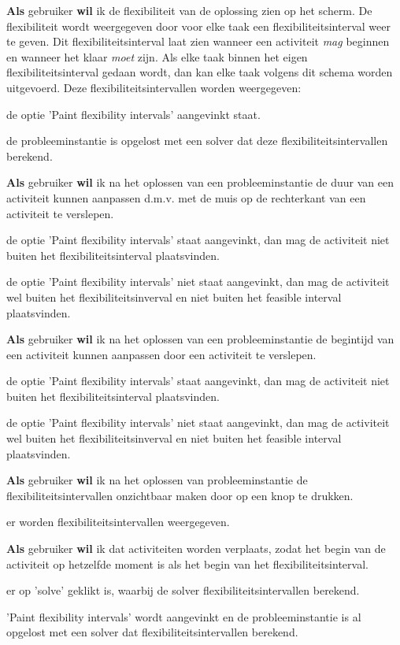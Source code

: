 \nextUserStory
\textbf{Als} gebruiker \textbf{wil} ik de flexibiliteit van de oplossing zien op het scherm. De flexibiliteit wordt weergegeven door voor elke taak een flexibiliteitsinterval weer te geven. Dit flexibiliteitsinterval laat zien wanneer een activiteit \emph{mag} beginnen en wanneer het klaar \emph{moet} zijn. Als elke taak binnen het eigen flexibiliteitsinterval gedaan wordt, dan kan elke taak volgens dit schema worden uitgevoerd. Deze flexibiliteitsintervallen worden weergegeven:
\beginGegeven
    \item de optie 'Paint flexibility intervals' aangevinkt staat.
    \item de probleeminstantie is opgelost met een solver dat deze flexibiliteitsintervallen berekend. 
\endGegeven

\nextUserStory
\textbf{Als} gebruiker \textbf{wil} ik na het oplossen van een probleeminstantie de duur van een activiteit kunnen aanpassen d.m.v. met de muis op de rechterkant van een activiteit te verslepen. 
\beginAls
    \item de optie 'Paint flexibility intervals' staat aangevinkt, dan mag de activiteit niet buiten het flexibiliteitsinterval plaatsvinden. 
    \item de optie 'Paint flexibility intervals' niet staat aangevinkt, dan mag de activiteit wel buiten het flexibiliteitsinverval en niet buiten het feasible interval plaatsvinden. 
\endAls

\nextUserStory 
\textbf{Als} gebruiker \textbf{wil} ik na het oplossen van een probleeminstantie de begintijd van een activiteit kunnen aanpassen door een activiteit te verslepen.
\beginAls
    \item de optie 'Paint flexibility intervals' staat aangevinkt, dan mag de activiteit niet buiten het flexibiliteitsinterval plaatsvinden. 
    \item de optie 'Paint flexibility intervals' niet staat aangevinkt, dan mag de activiteit wel buiten het flexibiliteitsinverval en niet buiten het feasible interval plaatsvinden. 
\endAls

\nextUserStory
\textbf{Als} gebruiker \textbf{wil} ik na het oplossen van probleeminstantie de flexibiliteitsintervallen onzichtbaar maken door op een knop te drukken. 
\beginGegeven
    \item er worden flexibiliteitsintervallen weergegeven.
\endGegeven

\nextUserStory
\textbf{Als} gebruiker \textbf{wil} ik dat activiteiten worden verplaats, zodat het begin van de activiteit op hetzelfde moment is als het begin van het flexibiliteitsinterval. 
\beginAls
    \item er op 'solve' geklikt is, waarbij de solver flexibiliteitsintervallen berekend.
    \item 'Paint flexibility intervals' wordt aangevinkt en de probleeminstantie is al opgelost met een solver dat flexibiliteitsintervallen berekend. 
\endAls

